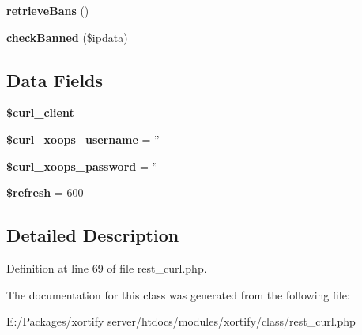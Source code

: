 \begin{DoxyCompactItemize}
\item 
\hypertarget{class_r_e_s_t___c_u_r_l_xortify_exchange_a4af29af927aae9aada97ef0c2cd08fa1}{{\bfseries retrieve\-Bans} ()}\label{class_r_e_s_t___c_u_r_l_xortify_exchange_a4af29af927aae9aada97ef0c2cd08fa1}

\item 
\hypertarget{class_r_e_s_t___c_u_r_l_xortify_exchange_ae41df0f26620b727f7f63342648f6474}{{\bfseries check\-Banned} (\$ipdata)}\label{class_r_e_s_t___c_u_r_l_xortify_exchange_ae41df0f26620b727f7f63342648f6474}

\end{DoxyCompactItemize}
\subsection*{Data Fields}
\begin{DoxyCompactItemize}
\item 
\hypertarget{class_r_e_s_t___c_u_r_l_xortify_exchange_a402f2112991f3227835af80e9df33e38}{{\bfseries \$curl\-\_\-client}}\label{class_r_e_s_t___c_u_r_l_xortify_exchange_a402f2112991f3227835af80e9df33e38}

\item 
\hypertarget{class_r_e_s_t___c_u_r_l_xortify_exchange_aab7480ba9f878a02b2c9fd43922fa070}{{\bfseries \$curl\-\_\-xoops\-\_\-username} = ''}\label{class_r_e_s_t___c_u_r_l_xortify_exchange_aab7480ba9f878a02b2c9fd43922fa070}

\item 
\hypertarget{class_r_e_s_t___c_u_r_l_xortify_exchange_a6c9851541ed3826c67cfe7224c38f0b8}{{\bfseries \$curl\-\_\-xoops\-\_\-password} = ''}\label{class_r_e_s_t___c_u_r_l_xortify_exchange_a6c9851541ed3826c67cfe7224c38f0b8}

\item 
\hypertarget{class_r_e_s_t___c_u_r_l_xortify_exchange_a8527f826b6959aaa92b0e51ee427ba1a}{{\bfseries \$refresh} = 600}\label{class_r_e_s_t___c_u_r_l_xortify_exchange_a8527f826b6959aaa92b0e51ee427ba1a}

\end{DoxyCompactItemize}


\subsection{Detailed Description}


Definition at line 69 of file rest\-\_\-curl.\-php.



The documentation for this class was generated from the following file\-:\begin{DoxyCompactItemize}
\item 
E\-:/\-Packages/xortify server/htdocs/modules/xortify/class/rest\-\_\-curl.\-php\end{DoxyCompactItemize}
